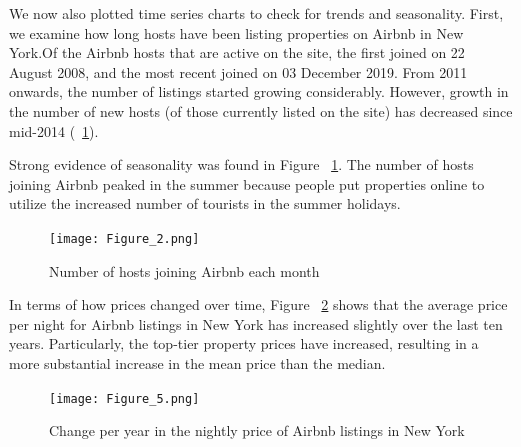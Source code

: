 We now also plotted time series charts to check for trends and seasonality.
First, we examine how long hosts have been listing properties on Airbnb in New
York.Of the Airbnb hosts that are active on the site, the first joined on 22
August 2008, and the most recent joined on 03 December 2019.
From 2011 onwards, the number of listings started growing considerably. However,
growth in the number of new hosts (of those currently listed on the site) has
decreased since mid-2014 (~\ref{fig:number_of_hosts_joining}).

Strong evidence of seasonality was found in Figure
~\ref{fig:number_of_hosts_joining}. The number of hosts joining Airbnb peaked in
the summer because people put properties online to utilize the increased number
of tourists in the summer holidays.




\begin{figure}[H] \centering
\caption{Number of hosts joining Airbnb each month}
    \texttt{[image: Figure\_2.png]}
    \label{fig:number_of_hosts_joining}
\end{figure}



In terms of how prices changed over time, Figure
~\ref{fig:prices-change-by-years} shows that the average price per night for
Airbnb listings in New York has increased slightly over the
last ten years. Particularly, the top-tier property prices have increased,
resulting in a more substantial increase in the mean price than the median.

\begin{figure}[H] \centering
\caption{Change per year in the nightly price of Airbnb listings in New York}
    \texttt{[image: Figure\_5.png]}
    \label{fig:prices-change-by-years}
\end{figure}

